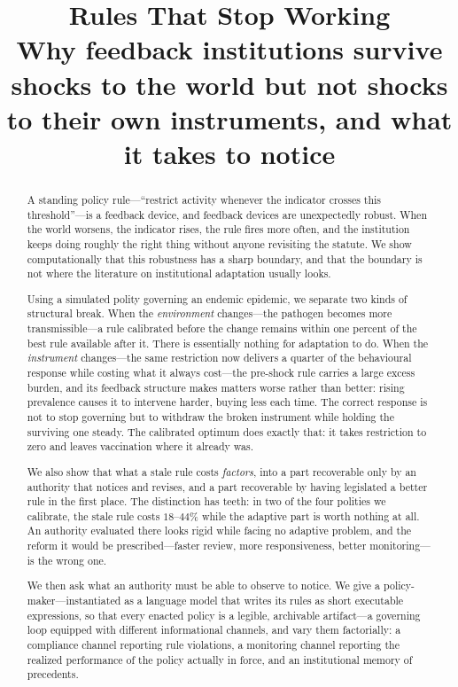 \documentclass[11pt]{article}
\title{\bfseries Rules That Stop Working\\
\large Why feedback institutions survive shocks to the world but not shocks to their own
instruments, and what it takes to notice}
\author{}
\date{}
\begin{document}
\maketitle

\begin{abstract}
\noindent
A standing policy rule---``restrict activity whenever the indicator crosses this threshold''---is a
feedback device, and feedback devices are unexpectedly robust. When the world worsens, the indicator
rises, the rule fires more often, and the institution keeps doing roughly the right thing without
anyone revisiting the statute. We show computationally that this robustness has a sharp boundary,
and that the boundary is not where the literature on institutional adaptation usually looks.

Using a simulated polity governing an endemic epidemic, we separate two kinds of structural break.
When the \emph{environment} changes---the pathogen becomes more transmissible---a rule calibrated
before the change remains within one percent of the best rule available after it. There is
essentially nothing for adaptation to do. When the \emph{instrument} changes---the same restriction
now delivers a quarter of the behavioural response while costing what it always cost---the pre-shock
rule carries a large excess burden, and its feedback structure makes matters worse rather than
better: rising prevalence causes it to intervene harder, buying less each time. The correct response
is not to stop governing but to withdraw the broken instrument while holding the surviving one
steady. The calibrated optimum does exactly that: it takes restriction to zero and leaves vaccination
where it already was.

We also show that what a stale rule costs \emph{factors}, into a part recoverable only by an
authority that notices and revises, and a part recoverable by having legislated a better rule in the
first place. The distinction has teeth: in two of the four polities we calibrate, the stale rule
costs $18$--$44\%$ while the adaptive part is worth nothing at all. An authority evaluated there
looks rigid while facing no adaptive problem, and the reform it would be prescribed---faster review,
more responsiveness, better monitoring---is the wrong one.

We then ask what an authority must be able to observe to notice. We give a policy-maker---instantiated
as a language model that writes its rules as short executable expressions, so that every enacted
policy is a legible, archivable artifact---a governing loop equipped with different informational
channels, and vary them factorially: a compliance channel reporting rule violations, a monitoring
channel reporting the realized performance of the policy actually in force, and an institutional
memory of precedents. \ResultsAbstractSentence


\end{abstract}
\end{document}
